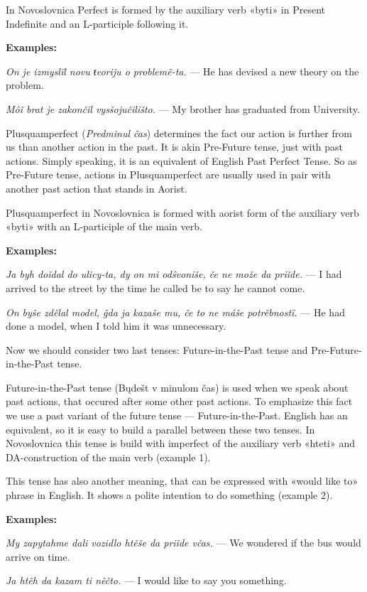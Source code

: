 In Novoslovnica Perfect is formed by the auxiliary verb «byti» in Present Indefinite and an L-participle following it.

\textbf{Examples:}

\textit{On je izmyslïl novu ŧeoriju o problemě-ta.} — He has devised a new theory on the problem.

\textit{Môǐ brat je zakončil vysšojučilišto.} — My brother has graduated from University.

Plusquamperfect (\textit{Predminul čas}) determines the fact our action is further from us than another action in the past. It is akin Pre-Future tense, just with past actions. Simply speaking, it is an equivalent of English Past Perfect Tense. So as Pre-Future tense, actions in Plusquamperfect are usually used in pair with another past action that stands in Aorist.

Plusquamperfect in Novoslovnica is formed with aorist form of the auxiliary verb «byti» with an L-participle of the main verb.

\textbf{Examples:}

\textit{Ja byh doǐdal do ulicy-ta, dy on mi odŝvoniše, če ne može da priǐde.} — I had arrived to the street by the time he called be to say he cannot come.

\textit{On byše zdělal model, ĝda ja kazaše mu, če to ne máše potrěbnostï.} — He had done a model, when I told him it was unnecessary. 

Now we should consider two last tenses: Future-in-the-Past tense and Pre-Future-in-the-Past tense.

Future-in-the-Past tense (Bųdešt v minulom čas) is used when we speak about past actions, that occured after some other past actions. To emphasize this fact we use a past variant of the future tense — Future-in-the-Past. English has an equivalent, so it is easy to build a parallel between these two tenses. In Novoslovnica this tense is build with imperfect of the auxiliary verb «hteti» and DA-construction of the main verb (example 1).

This tense has also another meaning, that can be expressed with «would like to» phrase in English. It shows a polite intention to do something (example 2).

\textbf{Examples:}

\textit{My zapytahme dali vozidlo htěše da priǐde včas.} — We wondered if the bus would arrive on time.

\textit{Ja htěh da kazam ti něčto.} — I would like to say you something.

